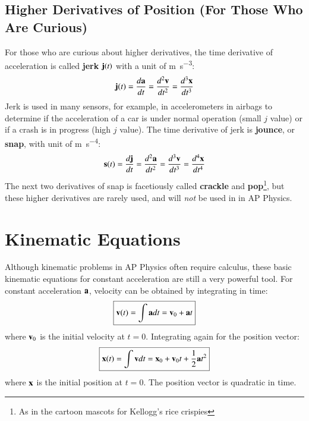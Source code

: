 \documentclass[11pt]{article}
\newcommand{\mb}[1]{\ensuremath\mathbf{#1}}
\begin{document}
\subsection{Higher Derivatives of Position (For Those Who Are Curious)}

For those who are curious about higher derivatives, the time derivative of
acceleration is called \textbf{jerk} $\mb{j}(t)$ with a unit of
\si{\metre\per\second^3}:
\begin{equation}
  \mb{j}(t)=\frac{d\mb{a}}{dt}=\frac{d^2\mb{v}}{dt^2}=\frac{d^3\mb{x}}{dt^3}
\end{equation}
Jerk is used in many sensors, for example, in accelerometers in airbags to
determine if the acceleration of a car is under normal operation (small $j$
value) or if a crash is in progress (high $j$ value). The time derivative of
jerk is \textbf{jounce}, or \textbf{snap}, with unit of
\si{\metre\per\second^4}:
\begin{equation}
  \mb{s}(t)=\frac{d\mb{j}}{dt}=\frac{d^2\mb{a}}{dt^2}=\frac{d^3\mb{v}}{dt^3}
  =\frac{d^4\mb{x}}{dt^4}
\end{equation}
The next two derivatives of snap is facetiously called \textbf{crackle} and
\textbf{pop}\footnote{As in the cartoon mascots for Kellogg's rice crispies},
but these higher derivatives are rarely used, and will \emph{not} be used in
in AP Physics.



\section{Kinematic Equations}

Although kinematic problems in AP Physics often require calculus, these basic
kinematic equations for constant acceleration are still a very powerful tool.
For constant acceleration $\mb{a}$, velocity can be obtained by integrating
in time:
\begin{equation}
  \boxed{\mb{v}(t)=\int \mb{a}dt = \mb{v}_0+ \mb{a}t}
  \label{eq:big5-1}
\end{equation}
where $\mb{v}_0$ is the initial velocity at $t=0$. Integrating again for the
position vector:
\begin{equation}
  \boxed{\mb{x}(t)=\int \mb{v}dt=\mb{x}_0+\mb{v}_0t+\frac12 \mb{a}t^2}
  \label{eq:big5-2}
\end{equation}
where $\mb{x}$ is the initial position at $t=0$. The position vector is
quadratic in time.
\end{document}
